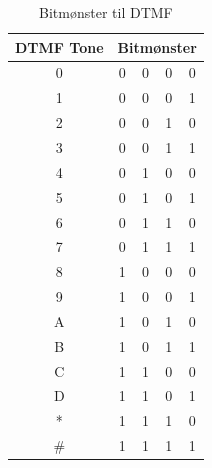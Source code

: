 \begin{table}[]
\centering
\caption{Bitmønster til DTMF}
\label{DTMFBitTabel}
\begin{tabular}{|c| c c c c|}
\hline
\multicolumn{1}{|l|}{DTMF Tone} & \multicolumn{4}{l|}{Bitmønster}                                                                   \\ \hline
0 								& 0						 & 0					  & 0
& 0						 \\ \hline
1 								& 0						 & 0					  & 0
& 1						 \\ \hline
2								& 0						 & 0					  & 1
& 0						 \\ \hline
3                               & 0                      & 0                      & 1                      & 1                      \\ \hline
4                               & 0                      & 1                      & 0                      & 0                      \\ \hline
5                               & 0                      & 1                      & 0                      & 1                      \\ \hline
6                               & 0                      & 1                      & 1                      & 0                      \\ \hline
7                               & 0                      & 1                      & 1                      & 1                      \\ \hline
8                               & 1                      & 0                      & 0                      & 0                      \\ \hline
9                               & 1                      & 0                      & 0                      & 1                      \\ \hline
A                               & 1                      & 0                      & 1                      & 0                      \\ \hline
B                               & 1                      & 0                      & 1                      & 1                      \\ \hline
C                               & 1                      & 1                      & 0                      & 0                      \\ \hline
D                               & 1                      & 1                      & 0                      & 1                      \\ \hline
*                               & 1                      & 1                      & 1                      & 0                      \\ \hline
\#                              & 1                      & 1                      & 1                      & 1                      \\ \hline
\end{tabular}
\end{table}

